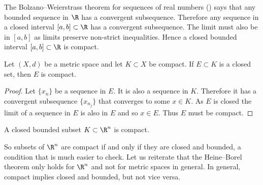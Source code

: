 \documentclass[12pt]{book}
\begin{document}
\begin{example}
The Bolzano--Weierstrass theorem for sequences of real numbers
()
says that any bounded sequence in $\R$ has a convergent
subsequence.
Therefore any sequence in a closed interval $[a,b] \subset \R$ has 
a convergent subsequence.
The limit must also be in $[a,b]$ as limits
preserve non-strict inequalities.
Hence a closed bounded interval $[a,b]
\subset \R$ is compact.
\end{example}

\begin{prop}
Let $(X,d)$ be a metric space and let $K \subset X$ be compact.
If
$E \subset K$ is a closed set, then $E$ is compact.
\end{prop}

\begin{proof}
Let $\{ x_n \}$ be a sequence in $E$.
It is also a sequence in $K$.
Therefore it has a convergent subsequence $\{ x_{n_j} \}$ that converges to
some $x \in K$.
As $E$ is closed the limit of a sequence in $E$ is also in $E$
and so $x \in E$.
Thus $E$ must be compact.
\end{proof}

\begin{thm}%
\label{thm:msbw}
A closed bounded subset $K \subset \R^n$ is compact.
\end{thm}

So subsets of $\R^n$ are compact if and only if they are closed and bounded,
a condition that is much easier to check.
Let us reiterate that the Heine--Borel theorem only holds for $\R^n$ and not
for metric spaces in general.
In general, compact implies closed and
bounded, but not vice versa.
\end{document}
